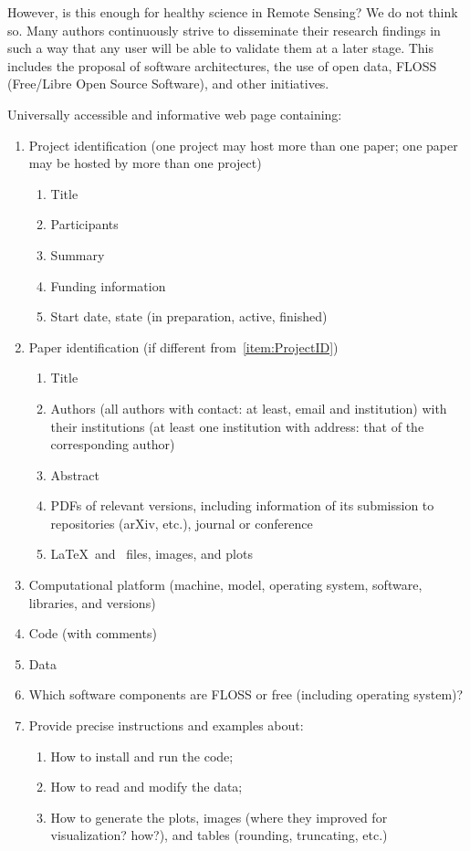 \documentclass[journal]{IEEEtran}
\begin{document}
However, is this enough for healthy science in Remote Sensing? 
We do not think so. 
Many authors continuously strive to disseminate their research findings in such a way that any user will be able to validate them at a later stage. 
This includes the proposal of software architectures, the use of open data, FLOSS (Free/Libre Open Source Software), and other initiatives.
		
Universally accessible and informative web page containing:
	\begin{enumerate}
		\item\label{item:ProjectID} Project identification (one project may host more than one paper; one paper may be hosted by more than one project)
		\begin{enumerate}
			\item Title
			\item Participants
			\item Summary
			\item Funding information
			\item Start date, state (in preparation, active, finished)
		\end{enumerate}
		\item Paper identification (if different from~\ref{item:ProjectID})
		\begin{enumerate}
			\item Title
			\item Authors (all authors with contact: at least, email and institution) with their institutions (at least one institution with address: that of the corresponding author)
			\item Abstract
			\item PDFs of relevant versions, including information of its submission to repositories (arXiv, etc.), journal or conference
			\item\label{item:SourceDocumentFiles} \LaTeX\ and \BibTeX\ files, images, and plots
		\end{enumerate}
		\item\label{item:Platform} Computational platform (machine, model, operating system, software, libraries, and versions)
		\item Code (with comments)
		\item Data
		\item Which software components are FLOSS or free (including operating system)?
		\item Provide precise instructions and examples about:
		\begin{enumerate}
			\item How to install and run the code;
			\item How to read and modify the data;
			\item How to generate the plots, images (where they improved for visualization? how?), and tables (rounding, truncating, etc.)
		\end{enumerate}
	\end{enumerate}
	
\end{document}
